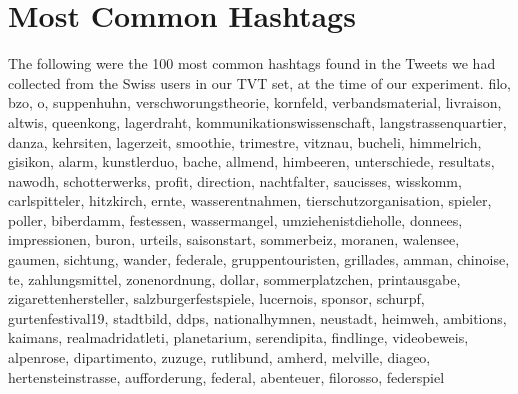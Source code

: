 \documentclass[10pt,a4paper]{article}
\begin{document}
\section{Most Common Hashtags}
\label{sec:appendix-hashtags}
The following were the 100 most common hashtags found in the Tweets we had collected from the Swiss users in our TVT set, at the time of our experiment.
\bigbreak
\noindent filo, bzo, o, suppenhuhn, verschworungstheorie, kornfeld, verbandsmaterial, livraison, altwis, queenkong, lagerdraht, kommunikationswissenschaft, langstrassenquartier, danza, kehrsiten, lagerzeit, smoothie, trimestre, vitznau, bucheli, himmelrich, gisikon, alarm, kunstlerduo, bache, allmend, himbeeren, unterschiede, resultats, nawodh, schotterwerks, profit, direction, nachtfalter, saucisses, wisskomm, carlspitteler, hitzkirch, ernte, wasserentnahmen, tierschutzorganisation, spieler, poller, biberdamm, festessen, wassermangel, umziehenistdieholle, donnees, impressionen, buron, urteils, saisonstart, sommerbeiz, moranen, walensee, gaumen, sichtung, wander, federale, gruppentouristen, grillades, amman, chinoise, te, zahlungsmittel, zonenordnung, dollar, sommerplatzchen, printausgabe, zigarettenhersteller, salzburgerfestspiele, lucernois, sponsor, schurpf, gurtenfestival19, stadtbild, ddps, nationalhymnen, neustadt, heimweh, ambitions, kaimans, realmadridatleti, planetarium, serendipita, findlinge, videobeweis, alpenrose, dipartimento, zuzuge, rutlibund, amherd, melville, diageo, hertensteinstrasse, aufforderung, federal, abenteuer, filorosso, federspiel
\end{document}
